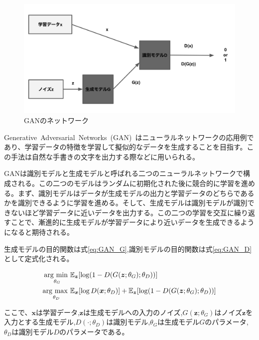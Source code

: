 \begin{figure}[t]
\begin{center}
\includegraphics[width=\hsize]{figure/GAN_net.png}
\caption{GANのネットワーク}
\label{fig:GAN_net}
\end{center}
\end{figure}


Generative~Adversarial~Networks~(GAN)~\cite{GAN}はニューラルネットワークの応用例であり、学習データの特徴を学習して擬似的なデータを生成することを目指す。この手法は自然な手書きの文字を出力する際などに用いられる。

GANは識別モデルと生成モデルと呼ばれる二つのニューラルネットワークで構成される。この二つのモデルはランダムに初期化された後に競合的に学習を進める。まず、識別モデルはデータが生成モデルの出力と学習データのどちらであるかを識別できるように学習を進める。そして、生成モデルは識別モデルが識別できないほど学習データに近いデータを出力する。この二つの学習を交互に繰り返すことで、漸進的に生成モデルが学習データにより近いデータを生成できるようになると期待される。

生成モデルの目的関数は式\ref{eq:GAN_G},識別モデルの目的関数は式\ref{eq:GAN_D}として定式化される。

\begin{align}
    \label{eq:GAN_G}
    \mathop{\rm arg~min~}\limits _{\theta_G}& \mathbb{E}_{\boldsymbol{z}}[\log (1-D(G(\boldsymbol{z};\theta_G);\theta_D))]\\
    \label{eq:GAN_D}
    \mathop{\rm arg~max~}\limits _{\theta_D}& \mathbb{E}_{\boldsymbol{x}}[\log D(\boldsymbol{x};\theta_D)]+\mathbb{E}_{\boldsymbol{z}}[\log (1-D(G(\boldsymbol{z};\theta_G);\theta_D))]
\end{align}

ここで、$\boldsymbol{x}$は学習データ,$\boldsymbol{z}$は生成モデルへの入力のノイズ,$G(\boldsymbol{z};\theta_G)$はノイズ$\boldsymbol{z}$を入力とする生成モデル,$D(\cdot;\theta_D)$は識別モデル,$\theta_G$は生成モデル$G$のパラメータ,$\theta_D$は識別モデル$D$のパラメータである。



